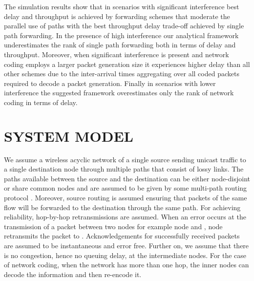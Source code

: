 \documentclass[journal, onecolumn, 12pt]{IEEEtran}
\begin{document}
The simulation results show that in scenarios with significant interference best delay and throughput is achieved by forwarding schemes that moderate the parallel use of paths with the
best throughput delay trade-off achieved by single path forwarding.
In the presence of high interference our analytical framework underestimates the rank of single path forwarding both in terms of delay and throughput.
Moreover, when significant interference is present and network coding employs a larger packet generation size it experiences higher delay than all other schemes due to the inter-arrival times
aggregating over all coded packets required to decode a packet generation.
Finally in scenarios with lower interference the suggested framework overestimates only the rank of network coding in terms of delay.


\section{\uppercase{System Model}}
\label{sec:system_model}

We assume a wireless acyclic network of a single source sending unicast traffic to a single destination node through multiple paths that consist of lossy links.
The paths available between the source and the destination can be either node-disjoint or share common nodes and are assumed to be given by some multi-path routing protocol \cite{multipath_olsr}.
Moreover, source routing is assumed ensuring that packets of the same flow will be forwarded to the destination through the same path.
For achieving reliability, hop-by-hop retransmissions are assumed.
When an error occurs at the transmission of a packet between two nodes for example node  and , node  retransmits the packet to .
Acknowledgements for successfully received packets are assumed to be instantaneous and error free.
Further on, we assume that there is no congestion, hence no queuing delay, at the intermediate nodes.
For the case of network coding, when the network has more than one hop, the inner nodes can decode the information and then re-encode it.
\end{document}

